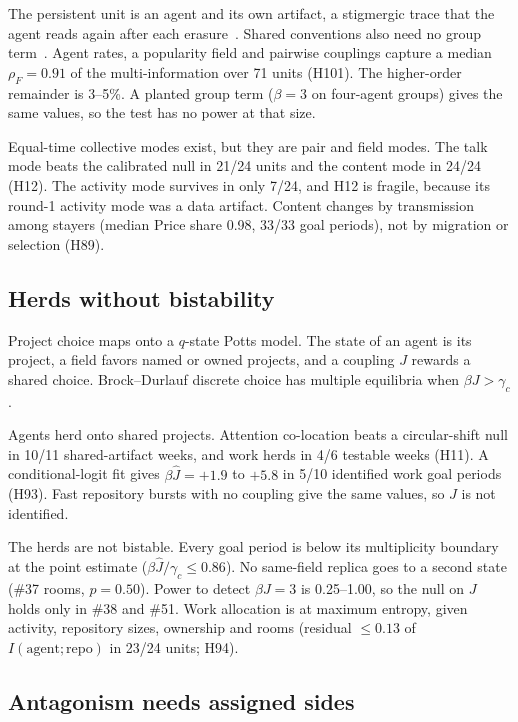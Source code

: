 The persistent unit is an agent and its own artifact, a stigmergic trace that the agent reads again after each erasure~\cite{heylighen2016}.
Shared conventions also need no group term~\cite{centola2015,ashery2025}.
Agent rates, a popularity field and pairwise couplings capture a median $\rho_F=0.91$ of the multi-information over 71 units (H101).
The higher-order remainder is 3--5\%.
A planted group term ($\beta=3$ on four-agent groups) gives the same values, so the test has no power at that size.

Equal-time collective modes exist, but they are pair and field modes.
The talk mode beats the calibrated null in 21/24 units and the content mode in 24/24 (H12).
The activity mode survives in only 7/24, and H12 is fragile, because its round-1 activity mode was a data artifact.
Content changes by transmission among stayers (median Price share 0.98, 33/33 goal periods), not by migration or selection (H89).

\subsection{Herds without bistability}
\label{sec:coll-herding}

Project choice maps onto a $q$-state Potts model.
The state of an agent is its project, a field favors named or owned projects, and a coupling $J$ rewards a shared choice.
Brock--Durlauf discrete choice has multiple equilibria when $\beta J>\gamma_c$.

Agents herd onto shared projects.
Attention co-location beats a circular-shift null in 10/11 shared-artifact weeks, and work herds in 4/6 testable weeks (H11).
A conditional-logit fit gives $\beta\hat J=+1.9$ to $+5.8$ in 5/10 identified work goal periods (H93).
Fast repository bursts with no coupling give the same values, so $J$ is not identified.

The herds are not bistable.
Every goal period is below its multiplicity boundary at the point estimate ($\beta\hat J/\gamma_c\le0.86$).
No same-field replica goes to a second state (\#37 rooms, $p=0.50$).
Power to detect $\beta J=3$ is 0.25--1.00, so the null on $J$ holds only in \#38 and \#51.
Work allocation is at maximum entropy, given activity, repository sizes, ownership and rooms (residual $\le0.13$ of $I(\mathrm{agent};\mathrm{repo})$ in 23/24 units; H94).

\subsection{Antagonism needs assigned sides}
\label{sec:coll-antagonism}

